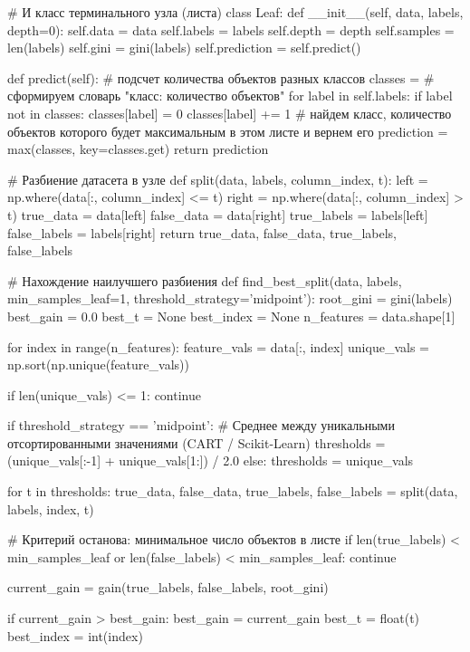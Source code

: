 \documentclass[14pt,a4paper]{extarticle}
\begin{document}
\begin{CodeListing}
# И класс терминального узла (листа)
class Leaf:
    def __init__(self, data, labels, depth=0):
        self.data = data
        self.labels = labels
        self.depth = depth
        self.samples = len(labels)
        self.gini = gini(labels)
        self.prediction = self.predict()

    def predict(self):
        # подсчет количества объектов разных классов
        classes = {}  # сформируем словарь "класс: количество объектов"
        for label in self.labels:
            if label not in classes:
                classes[label] = 0
            classes[label] += 1
        # найдем класс, количество объектов которого будет максимальным в этом листе и вернем его
        prediction = max(classes, key=classes.get)
        return prediction


# Разбиение датасета в узле
def split(data, labels, column_index, t):
    left = np.where(data[:, column_index] <= t)
    right = np.where(data[:, column_index] > t)
    true_data = data[left]
    false_data = data[right]
    true_labels = labels[left]
    false_labels = labels[right]
    return true_data, false_data, true_labels, false_labels


# Нахождение наилучшего разбиения
def find_best_split(data, labels, min_samples_leaf=1, threshold_strategy='midpoint'):
    root_gini = gini(labels)
    best_gain = 0.0
    best_t = None
    best_index = None
    n_features = data.shape[1]

    for index in range(n_features):
        feature_vals = data[:, index]
        unique_vals = np.sort(np.unique(feature_vals))

        if len(unique_vals) <= 1:
            continue

        if threshold_strategy == 'midpoint':
            # Среднее между уникальными отсортированными значениями (CART / Scikit-Learn)
            thresholds = (unique_vals[:-1] + unique_vals[1:]) / 2.0
        else:
            thresholds = unique_vals

        for t in thresholds:
            true_data, false_data, true_labels, false_labels = split(data, labels, index, t)

            # Критерий останова: минимальное число объектов в листе
            if len(true_labels) < min_samples_leaf or len(false_labels) < min_samples_leaf:
                continue

            current_gain = gain(true_labels, false_labels, root_gini)

            if current_gain > best_gain:
                best_gain = current_gain
                best_t = float(t)
                best_index = int(index)


\end{CodeListing}
\end{document}
